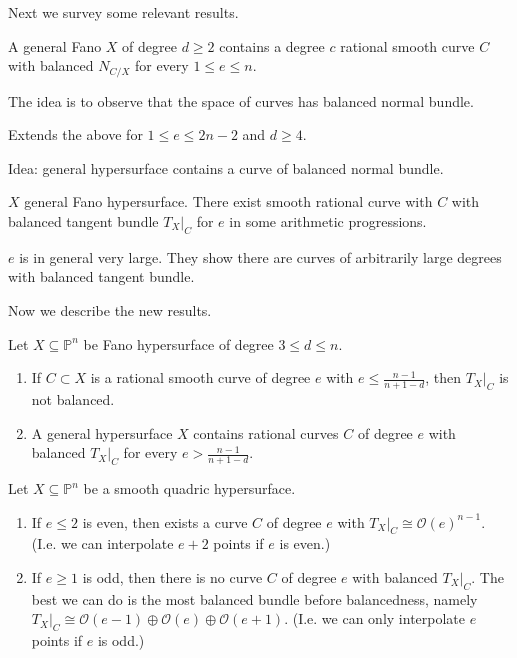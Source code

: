 \medskip\noindent
Next we survey some relevant results.

\begin{theorem}
\label{theorem-CR18}
A general Fano $X$ of degree $d \geq 2$
contains a degree $c$ rational smooth curve
 $C$ with balanced $N_{C/X}$
for every $1 \leq e \leq  n$.
\end{theorem}

The idea is to observe that the space of
curves has
balanced normal bundle.

\begin{theorem}[Ran, 2021]
\label{theorem-R21}
Extends the above for
$1 \leq  e \leq 2n-2$
and $d \geq 4$.
\end{theorem}

Idea: general hypersurface contains a curve
of balanced normal bundle.

\begin{theorem}[Ran, 2024]
\label{theorem-R24}
$X$ general Fano hypersurface.
There exist smooth rational curve with  $C$
with balanced tangent bundle $T_{X}|_{C}$
for $e$ in some arithmetic progressions.
\end{theorem}

$e$ is in general very large.
They show there are curves of arbitrarily
large
degrees with balanced tangent bundle.

\medskip\noindent
Now we describe the new results.

\begin{theorem}
\label{theorem-Lucas}
Let $X \subseteq \mathbb{P}^n$ be Fano
hypersurface of degree $3 \leq d \leq n$.

\begin{enumerate}
\item If $C \subset X$ is a rational smooth
curve
of degree $e$ with
$e \leq  \frac{n-1}{n+1-d}$,
then $T_X|_{C}$ is not balanced.

\item A general hypersurface $X$
contains rational curves $C$
of degree $e$ with balanced
$T_X|_{C}$ for every
$e> \frac{n-1}{n+1-d}$.
\end{enumerate}
\end{theorem}

\begin{theorem}
\label{theorem-lucas2}
Let $X \subseteq \mathbb{P}^n$ be a smooth
quadric hypersurface.

\begin{enumerate}
\item If $e \leq 2$ is even,
then exists a curve $C$ of degree $e$
with $T_X|_{C}\cong \mathcal{O}(e)^{n-1}$.
(I.e. we can interpolate $e+2$ points
if $e$ is even.)

\item If $e \geq 1$ is odd,
then there is no curve $C$ of degree $e$
with balanced $T_X|_C$.
The best we can do is the most balanced
bundle
before balancedness, namely
$T_X|_C \cong
\mathcal{O}(e-1)\oplus\mathcal{O}(e)
\oplus\mathcal{O}(e+1)$.
(I.e. we can only interpolate $e$ points if
$e$ is odd.)
\end{enumerate}
\end{theorem}

